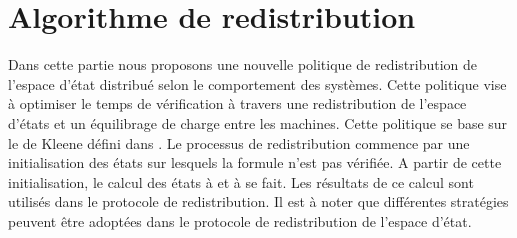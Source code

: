 \makeatother
\section{Algorithme de redistribution }
 
Dans cette partie nous proposons une nouvelle politique de redistribution de l'espace d'\'{e}tat distribué selon le comportement des systèmes. Cette politique vise à optimiser le temps de vérification à travers une redistribution de l'espace d'états  et un  équilibrage de charge entre les machines. Cette politique se base sur le \mc{} de Kleene défini dans \citep{depriester2011bouneb}. Le processus de redistribution commence par une initialisation des états sur lesquels la formule n'est pas vérifiée. A partir de cette initialisation, le calcul des états à \deplacer{} et à \dupliquer{} se fait. Les résultats de ce calcul sont utilisés dans le protocole de redistribution. Il est à noter que différentes stratégies peuvent être adoptées dans le protocole de redistribution de l'espace d'état. 





